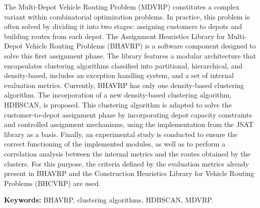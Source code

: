 \documentclass[12pt,letterpaper,oneside]{report}
\begin{document}
The Multi-Depot Vehicle Routing Problem (MDVRP) constitutes a complex variant within combinatorial optimization problems. In practice, this problem is often solved by dividing it into two stages: assigning customers to depots and building routes from each depot. The Assignment Heuristics Library for Multi-Depot Vehicle Routing Problems (BHAVRP) is a software component designed to solve this first assignment phase. The library features a modular architecture that encapsulates clustering algorithms classified into partitional, hierarchical, and density-based, includes an exception handling system, and a set of internal evaluation metrics. Currently, BHAVRP has only one density-based clustering algorithm. The incorporation of a new density-based clustering algorithm, HDBSCAN, is proposed. This clustering algorithm is adapted to solve the customer-to-depot assignment phase by incorporating depot capacity constraints and controlled assignment mechanisms, using the implementation from the JSAT library as a basis. Finally, an experimental study is conducted to ensure the correct functioning of the implemented modules, as well as to perform a correlation analysis between the internal metrics and the routes obtained by the clusters. For this purpose, the criteria defined by the evaluation metrics already present in BHAVRP and the Construction Heuristics Library for Vehicle Routing Problems (BHCVRP) are used.

\vspace{12pt}
\noindent\textbf{Keywords:} BHAVRP, clustering algorithms, HDBSCAN, MDVRP.

\tableofcontents
\listoffigures
\listoftables

\clearpage
{}
\setcounter{page}{1}






\printbibliography[title={Referencias Bibliográficas}, heading=bibintoc]
\end{document}
